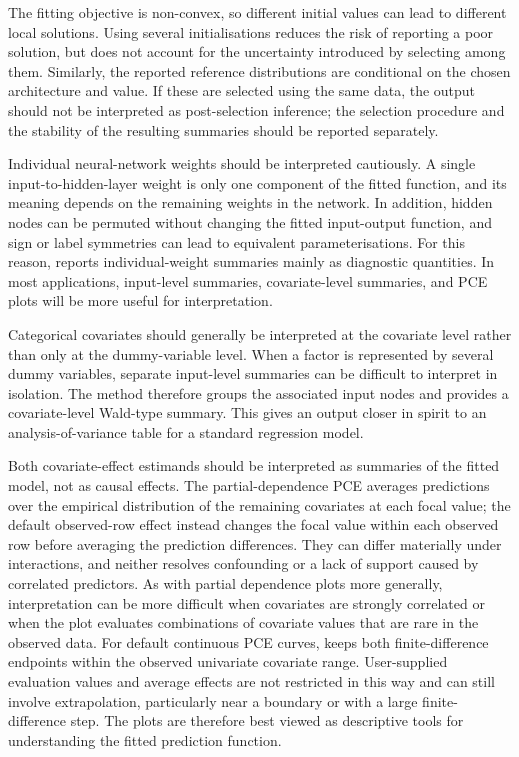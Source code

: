 The fitting objective is non-convex, so different initial values can lead to different local solutions.
Using several initialisations reduces the risk of reporting a poor solution, but does not account for the uncertainty introduced by selecting among them.
Similarly, the reported reference distributions are conditional on the chosen architecture and  value.
If these are selected using the same data, the output should not be interpreted as post-selection inference; the selection procedure and the stability of the resulting summaries should be reported separately.

Individual neural-network weights should be interpreted cautiously.
A single input-to-hidden-layer weight is only one component of the fitted function, and its meaning depends on the remaining weights in the network.
In addition, hidden nodes can be permuted without changing the fitted input-output function, and sign or label symmetries can lead to equivalent parameterisations.
For this reason,  reports individual-weight summaries mainly as diagnostic quantities.
In most applications, input-level summaries, covariate-level summaries, and PCE plots will be more useful for interpretation.

Categorical covariates should generally be interpreted at the covariate level rather than only at the dummy-variable level.
When a factor is represented by several dummy variables, separate input-level summaries can be difficult to interpret in isolation.
The  method therefore groups the associated input nodes and provides a covariate-level Wald-type summary.
This gives an output closer in spirit to an analysis-of-variance table for a standard regression model.

Both covariate-effect estimands should be interpreted as summaries of the fitted model, not as causal effects.
The partial-dependence PCE averages predictions over the empirical distribution of the remaining covariates at each focal value; the default observed-row effect instead changes the focal value within each observed row before averaging the prediction differences.
They can differ materially under interactions, and neither resolves confounding or a lack of support caused by correlated predictors.
As with partial dependence plots more generally, interpretation can be more difficult when covariates are strongly correlated or when the plot evaluates combinations of covariate values that are rare in the observed data.
For default continuous PCE curves,  keeps both finite-difference endpoints within the observed univariate covariate range.
User-supplied evaluation values and average effects are not restricted in this way and can still involve extrapolation, particularly near a boundary or with a large finite-difference step.
The plots are therefore best viewed as descriptive tools for understanding the fitted prediction function.

